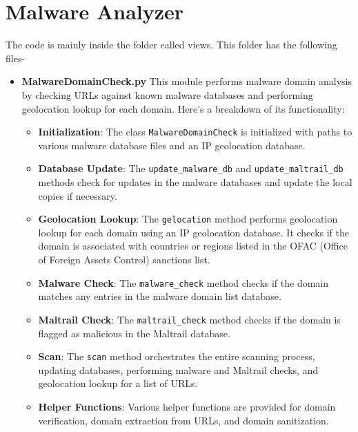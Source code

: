 \documentclass{report}
\begin{document}
\section{Malware Analyzer}
The code is mainly inside the folder called views. This folder has the following files-
\begin{itemize}
    \item \textbf{MalwareDomainCheck.py} This module performs malware domain analysis by checking URLs against known malware databases and performing geolocation lookup for each domain. Here's a breakdown of its functionality:

    \begin{itemize}
        \item \textbf{Initialization}: The class \texttt{MalwareDomainCheck} is initialized with paths to various malware database files and an IP geolocation database.
        
        \item \textbf{Database Update}: The \texttt{update\_malware\_db} and \texttt{update\_maltrail\_db} methods check for updates in the malware databases and update the local copies if necessary.
        
        \item \textbf{Geolocation Lookup}: The \texttt{gelocation} method performs geolocation lookup for each domain using an IP geolocation database. It checks if the domain is associated with countries or regions listed in the OFAC (Office of Foreign Assets Control) sanctions list.
        
        \item \textbf{Malware Check}: The \texttt{malware\_check} method checks if the domain matches any entries in the malware domain list database.
        
        \item \textbf{Maltrail Check}: The \texttt{maltrail\_check} method checks if the domain is flagged as malicious in the Maltrail database.
        
        \item \textbf{Scan}: The \texttt{scan} method orchestrates the entire scanning process, updating databases, performing malware and Maltrail checks, and geolocation lookup for a list of URLs.
        
        \item \textbf{Helper Functions}: Various helper functions are provided for domain verification, domain extraction from URLs, and domain sanitization.
    \end{itemize}


\end{itemize}
\end{document}
